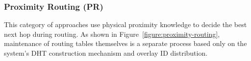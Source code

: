 %
%
%

\subsubsection{Proximity Routing (PR)}


This category of approaches use physical proximity knowledge to decide the best
next hop during routing. As shown in Figure~\ref{figure:proximity-routing},
maintenance of routing tables themselves is a separate process based only on the
system's DHT construction mechanism and overlay ID distribution.

